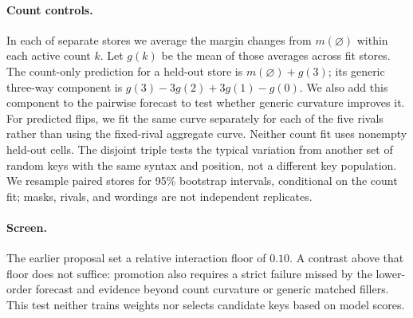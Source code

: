 \paragraph{Count controls.}
In each of \fitN{} separate stores we average the margin changes from $m(\varnothing)$ within each active count $k$.
Let $g(k)$ be the mean of those averages across fit stores.
The count-only prediction for a held-out store is $m(\varnothing)+g(3)$; its generic three-way component is
$g(3)-3g(2)+3g(1)-g(0)$.
We also add this component to the pairwise forecast to test whether generic curvature improves it.
For predicted flips, we fit the same curve separately for each of the five rivals rather than using the fixed-rival aggregate curve.
Neither count fit uses nonempty held-out cells.
The disjoint triple tests the typical variation from another set of random keys with the same syntax and position, not a different key population.
We resample paired stores for 95\% bootstrap intervals, conditional on the count fit; masks, rivals, and wordings are not independent replicates.

\paragraph{Screen.}
The earlier proposal set a relative interaction floor of $0.10$.
A contrast above that floor does not suffice: promotion also requires a strict failure missed by the lower-order forecast and evidence beyond count curvature or generic matched fillers.
This test neither trains weights nor selects candidate keys based on model scores.
